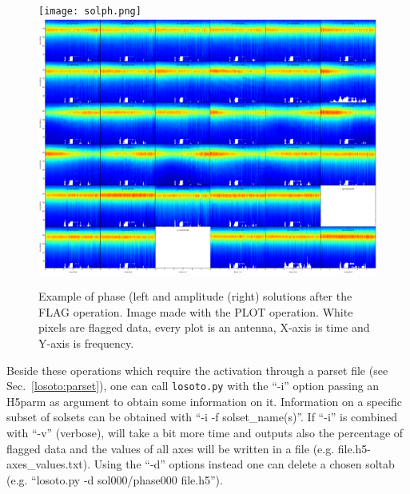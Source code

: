 \begin{figure}
\centering
\texttt{[image: solph.png]}
\includegraphics[width=.48\columnwidth]{solamp.png}
\caption{Example of phase (left and amplitude (right) solutions after the FLAG operation. Image made with the PLOT operation. White pixels are flagged data, every plot is an antenna, X-axis is time and Y-axis is frequency.}\label{fig:flag}
\end{figure}

Beside these operations which require the activation through a \losoto{} parset file (see Sec.~\ref{losoto:parset}), one can call \texttt{losoto.py} with the ``-i'' option passing an H5parm as argument to obtain some information on it. Information on a specific subset of solsets can be obtained with ``-i -f solset\_name(s)''. If ``-i'' is combined with ``-v'' (verbose), \losoto{} will take a bit more time and outputs also the percentage of flagged data and the values of all axes will be written in a file (e.g. file.h5-axes\_values.txt). Using the ``-d'' options instead one can delete a chosen soltab (e.g. ``losoto.py -d sol000/phase000 file.h5'').

